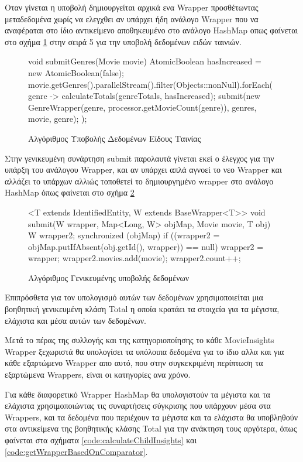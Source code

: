 Οταν γίνεται η υποβολή δημιουργείται αρχικά ενα Wrapper προσθέτωντας μεταδεδομένα χωρίς να ελεγχθει αν υπάρχει ήδη ανάλογο Wrapper που να αναφέραται στο ίδιο αντικείμενο αποθηκευμένο στο ανάλογο HashMap οπως φαίνεται στο σχήμα \ref{code:submitGenre} στην σειρά 5 για την υποβολή δεδομένων ειδών ταινιών.
\begin{figure}[h]
    \begin{javacode}
void submitGenres(Movie movie) {
    AtomicBoolean hasIncreased = new AtomicBoolean(false);
    movie.getGenres().parallelStream().filter(Objects::nonNull).forEach(genre -> {
        calculateTotals(genreTotals, hasIncreased);
        submit(new GenreWrapper(genre, processor.getMovieCount(genre)), genres, movie, genre);
    });
}
    \end{javacode}
    \caption{Αλγόριθμος Υποβολής Δεδομένων Είδους Ταινίας}
    \label{code:submitGenre}
\end{figure}

Στην γενικευμένη συνάρτηση submit παρολαυτά γίνεται εκεί ο έλεγχος για την υπάρξη του ανάλογου Wrapper, και αν υπάρχει απλά αγνοεί το νεο Wrapper και αλλάζει το υπάρχων αλλιώς τοποθετεί το δημιουργημένο wrapper στο ανάλογο HashMap όπως φαίνεται στο σχήμα \ref{code:submit}

\begin{figure}[h]
    \begin{javacode}
<T extends IdentifiedEntity, W extends BaseWrapper<T>> void submit(W wrapper, Map<Long, W> objMap, Movie movie, T obj) {
    W wrapper2;
    synchronized (objMap) {
        if ((wrapper2 = objMap.putIfAbsent(obj.getId(), wrapper)) == null) {
            wrapper2 = wrapper;
        }
    }
    wrapper2.movies.add(movie);
    wrapper2.count++;
}
    \end{javacode}
    \caption{Αλγόριθμος Γενικευμένης υποβολής δεδομένων}
    \label{code:submit}
\end{figure}

Επιπρόσθετα για τον υπολογισμό αυτών των δεδομένων χρησιμοποιείται μια βοηθητική γενικευμένη κλάση Total η οποία κρατάει τα στοιχεία για τα μέγιστα, ελάχιστα και μέσα αυτών των δεδομένων. 

Μετά το πέρας της συλλογής και της κατηγοριοποίησης το κάθε MovieInsights Wrapper ξεχωριστά θα υπολογίσει τα υπόλοιπα δεδομένα για το ίδιο αλλα και για κάθε εξαρτώμενο Wrapper απο αυτό, που στην συγκεκριμένη περίπτωση τα εξαρτώμενα Wrappers, είναι οι κατηγορίες ανα χρόνο.

Για κάθε διαφορετικό Wrapper HashMap θα υπολογιστούν τα μέγιστα και τα ελάχιστα χρησιμοποιώντας τις συναρτήσεις σύγκρισης που υπάρχουν μέσα στα Wrappers, και τα δεδομένα που περιέχουν τα μέγιστα και τα ελάχιστα θα υποβληθούν στα αντικείμενα της βοηθητικής κλάσης Total για την ανάκτηση τους αργότερα, όπως φαίνεται στα σχήματα \ref{code:calculateChildInsights} και \ref{code:getWrapperBasedOnComparator}.

